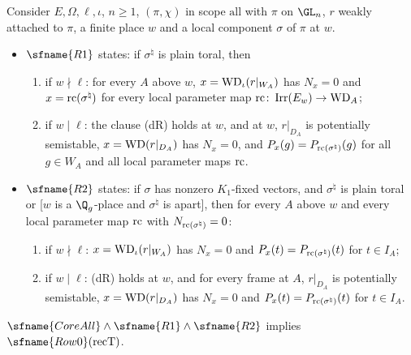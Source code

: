 \begin{definition}\label{pf:galred:R1R2}
Consider $E,\Omega,\ell,\iota$, $n\ge1$, $(\pi,\chi)$ in scope $\mathrm{all}$ with $\pi$ on $\GL_n$, $r$ weakly
attached to $\pi$, a finite place $w$ and a local component $\sigma$ of $\pi$ at $w$.
\begin{itemize}[nosep]
\item $\sfname{R1}$ states: if $\sigma^\natural$ is plain toral, then
  \begin{enumerate}[label=(\roman*),nosep]
  \item if $w\nmid\ell$: for every $A$ above $w$, $x=\mathrm{WD}_\iota(r|_{W_A})$ has $N_x=0$ and $x=\mathrm{rc}(\sigma^\natural)$
    for every local parameter map $\mathrm{rc}\colon\operatorname{Irr}(E_w)\to\mathrm{WD}_A$;
  \item if $w\mid\ell$: the clause (dR) holds at $w$, and at $w$, $r|_{D_A}$ is potentially semistable,
    $x=\mathrm{WD}(r|_{D_A})$ has $N_x=0$, and $P_x(g)=P_{\mathrm{rc}(\sigma^\natural)}(g)$ for all $g\in W_A$ and all local
    parameter maps $\mathrm{rc}$.
  \end{enumerate}
\item $\sfname{R2}$ states: if $\sigma$ has nonzero $K_1$-fixed vectors, and $\sigma^\natural$ is plain toral or [$w$ is a
  $\Q_g$-place and $\sigma^\natural$ is apart], then for every $A$ above $w$ and every local parameter map $\mathrm{rc}$ with
  $N_{\mathrm{rc}(\sigma^\natural)}=0$:
  \begin{enumerate}[label=(\roman*),nosep]
  \item if $w\nmid\ell$: $x=\mathrm{WD}_\iota(r|_{W_A})$ has $N_x=0$ and $P_x(t)=P_{\mathrm{rc}(\sigma^\natural)}(t)$ for
    $t\in I_A$;
  \item if $w\mid\ell$: (dR) holds at $w$, and for every frame at $A$, $r|_{D_A}$ is potentially semistable,
    $x=\mathrm{WD}(r|_{D_A})$ has $N_x=0$ and $P_x(t)=P_{\mathrm{rc}(\sigma^\natural)}(t)$ for $t\in I_A$.
  \end{enumerate}
\end{itemize}
\end{definition}

\begin{proposition}\label{pf:galred:deduce}
$\sfname{CoreAll}\wedge\sfname{R1}\wedge\sfname{R2}$ implies $\sfname{Row0}(\mathrm{recT})$.
\end{proposition}

